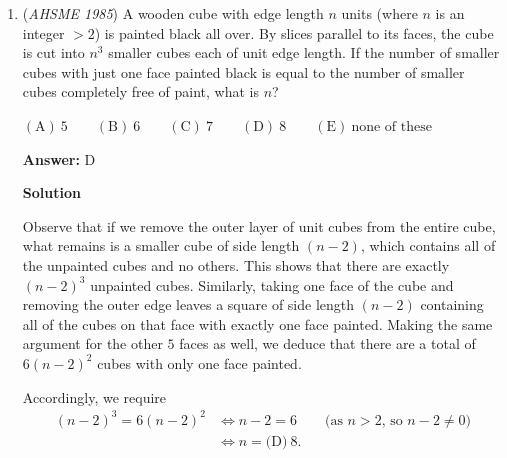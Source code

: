 \begin{enumerate}
 On the lower branch of the hyperbola, the maximum point is $(0,2-1) = (0,1)$, which is above the vertex of the parabola. Therefore, by continuity and the symmetry of both the parabola and the hyperbola in the $y$-axis, there are always exactly $2$ intersection points here.

 For the top branch, as it approaches the asymptote $y = x+1$, its slope also approaches that of this asymptote, which is $1$. However, for any upward-opening parabola, the slope approaches infinity as $x$ does, so no matter how small $A$ is (i.e. how 'flat' the parabola is), the parabola will eventually overtake the hyperbola, giving a point of intersection with positive $x$-coordinate. As above, symmetry gives another point of intersection with negative $x$-coordinate, so that there are $2$ intersection points with this branch too.

 Thus there are a total of $2+2 = \boxed{\text{(A) exactly} \ 4}$ intersection points.

 


	\item (\textit{AHSME 1985}) A wooden cube with edge length $n$ units (where $n$ is an integer $>2$) is painted black all over. By slices parallel to its faces, the cube is cut into $n^3$ smaller cubes each of unit edge length. If the number of smaller cubes with just one face painted black is equal to the number of smaller cubes completely free of paint, what is $n$?


 $\mathrm{(A)\ } 5 \qquad \mathrm{(B) \ }6 \qquad \mathrm{(C) \  } 7 \qquad \mathrm{(D) \  } 8 \qquad \mathrm{(E) \  }\text{none of these}$

 \textbf{Answer: }D



\textbf{Solution}

Observe that if we remove the outer layer of unit cubes from the entire cube, what remains is a smaller cube of side length $(n-2)$, which contains all of the unpainted cubes and no others. This shows that there are exactly $(n-2)^3$ unpainted cubes. Similarly, taking one face of the cube and removing the outer edge leaves a square of side length $(n-2)$ containing all of the cubes on that face with exactly one face painted. Making the same argument for the other $5$ faces as well, we deduce that there are a total of $6(n-2)^2$ cubes with only one face painted. 

 Accordingly, we require 
 \begin{align*}(n-2)^3 = 6(n-2)^2 &\iff n-2 = 6 \qquad \text{(as } n > 2\text{, so } n-2 \neq 0\text{)} \\ &\iff n = \boxed{\text{(D)} \ 8}.\end{align*}





\end{enumerate}

